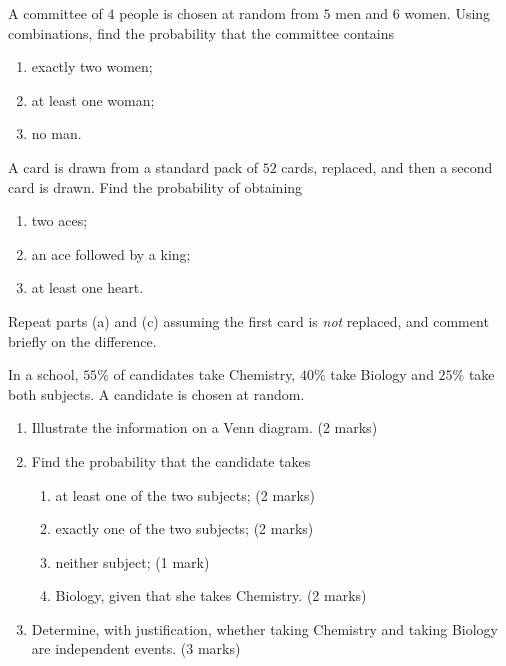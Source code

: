 \documentclass[11pt]{article}
\newcounter{popsec}
\newcounter{popsub}
\newcommand{\courssub}[1]{%
  \stepcounter{popsub}%
  \par\vspace{9pt}\noindent{\popxbold\fontsize{11.5}{13}\selectfont\color{popink}{\color{poporange}\thepopsec.\thepopsub}\hspace{6pt}#1}\par\nopagebreak\vspace{4pt}
}
\begin{document}
\begin{exercice}
A committee of $4$ people is chosen at random from $5$ men and $6$ women. Using combinations, find the probability that the committee contains
\begin{enumerate}
\item exactly two women;
\item at least one woman;
\item no man.
\end{enumerate}
\end{exercice}

\begin{exercice}
A card is drawn from a standard pack of $52$ cards, replaced, and then a second card is drawn. Find the probability of obtaining
\begin{enumerate}
\item two aces;
\item an ace followed by a king;
\item at least one heart.
\end{enumerate}
Repeat parts (a) and (c) assuming the first card is \emph{not} replaced, and comment briefly on the difference.
\end{exercice}

\courssub{I prepare for the GCE}

\begin{exercice}
In a school, $55\%$ of candidates take Chemistry, $40\%$ take Biology and $25\%$ take both subjects. A candidate is chosen at random.
\begin{enumerate}
\item Illustrate the information on a Venn diagram. \hfill (2 marks)
\item Find the probability that the candidate takes
\begin{enumerate}
\item at least one of the two subjects; \hfill (2 marks)
\item exactly one of the two subjects; \hfill (2 marks)
\item neither subject; \hfill (1 mark)
\item Biology, given that she takes Chemistry. \hfill (2 marks)
\end{enumerate}
\item Determine, with justification, whether taking Chemistry and taking Biology are independent events. \hfill (3 marks)
\end{enumerate}
\end{exercice}
\end{document}
